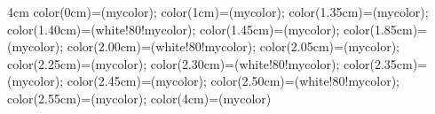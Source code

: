   {4cm}{
    color(0cm)=(mycolor);
    color(1cm)=(mycolor);
    color(1.35cm)=(mycolor);
    color(1.40cm)=(white!80!mycolor);
    color(1.45cm)=(mycolor);
    color(1.85cm)=(mycolor);
    color(2.00cm)=(white!80!mycolor);
    color(2.05cm)=(mycolor);
    color(2.25cm)=(mycolor);
    color(2.30cm)=(white!80!mycolor);
    color(2.35cm)=(mycolor);
    color(2.45cm)=(mycolor);
    color(2.50cm)=(white!80!mycolor);
    color(2.55cm)=(mycolor);
    color(4cm)=(mycolor)
  }
  
  \usepackage{listings}
  \usepackage{caption}
\captionsetup[lstlisting]{format=listing,labelfont=white,textfont=white}
\usepackage{longtable}





\newcommand{\CommonElementTextFormat}[4]
{
  \begin{minipage}{2.2cm}
    \centering
      {\textbf{#1} \hfill #2}%
      \linebreak \linebreak
      {\textbf{#3}}%
      \linebreak \linebreak
      {{#4}}
  \end{minipage}
}

\newcommand{\NaturalElementTextFormat}[4]
{
  \CommonElementTextFormat{#1}{#2}{\Huge {#3}}{#4}
}

\newcommand{\OutlineText}[1]
{
\ifpdf
  \pdfliteral direct {0.5 w 1 Tr}{#1}%
  \pdfliteral direct {1 w 0 Tr}%
\else
  \pscharpath[shadow=false,
    fillstyle=solid,
    fillcolor=white,
    linestyle=solid,
    linecolor=black,
    linewidth=.2pt]{#1} 
\fi
}

\newcommand{\SyntheticElementTextFormat}[4]
{
\ifpdf
  \CommonElementTextFormat{#1}{#2}{\OutlineText{\Huge #3}}{#4}
\else
  \CommonElementTextFormat{#1}{#2}{\OutlineText{\Large #3}}{#4}
\fi
}


